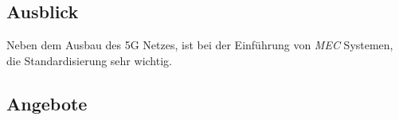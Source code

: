 \documentclass[runningheads]{llncs}
\numberwithin{figure}{section}
\begin{document}
\subsection{Ausblick}
Neben dem Ausbau des 5G Netzes, ist bei der Einführung von \textit{MEC} Systemen, 
die Standardisierung sehr wichtig. 
\subsection{Angebote}
\label{subsec:Angebote}
\label{sec:Ausblick}


\newpage
%
\printbibliography[heading=bibintoc]
\end{document}
